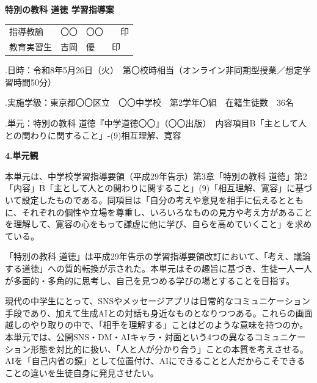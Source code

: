 \documentclass[uplatex,a4paper,11pt]{jsarticle}
\newcommand{\itemhead}[2]{\par\medskip\noindent\textbf{#1.\quad #2}\par\nopagebreak\smallskip}
\begin{document}
\begin{center}
  {\LARGE \textbf{特別の教科 道徳 学習指導案}}
\end{center}

\begin{flushright}
  \begin{tabular}{ll}
    指導教諭   & 〇〇　〇〇　　印 \\
    教育実習生 & 吉岡　優　　印 \\
  \end{tabular}
\end{flushright}

\bigskip

.\quad 日\hspace{1zw}時：令和8年5月26日（火）　第〇校時相当（オンライン非同期型授業／想定学習時間50分） \par
{}.\quad 実施学級：東京都〇〇区立　〇〇中学校　第2学年〇組　在籍生徒数　36名 \par
{}.\quad 単\hspace{1zw}元：特別の教科 道徳『中学道徳〇〇』（〇〇出版）　内容項目B「主として人との関わりに関すること」-(9)相互理解、寛容 \par


\itemhead{4}{単元観}
\hspace{1zw}本単元は、中学校学習指導要領（平成29年告示）第3章「特別の教科 道徳」第2「内容」B「主として人との関わりに関すること」(9)「相互理解、寛容」に基づいて設定したものである。同項目は「自分の考えや意見を相手に伝えるとともに、それぞれの個性や立場を尊重し、いろいろなものの見方や考え方があることを理解して、寛容の心をもって謙虚に他に学び、自らを高めていくこと」を求めている。\par
\hspace{1zw}「特別の教科 道徳」は平成29年告示の学習指導要領改訂において、「考え、議論する道徳」への質的転換が示された。本単元はその趣旨に基づき、生徒一人一人が多面的・多角的に思考し、自己を見つめる学びの場とすることを目指す。\par
\hspace{1zw}現代の中学生にとって、SNSやメッセージアプリは日常的なコミュニケーション手段であり、加えて生成AIとの対話も身近なものとなりつつある。これらの画面越しのやり取りの中で、「相手を理解する」ことはどのような意味を持つのか。本単元では、公開SNS・DM・AIキャラ・対面という4つの異なるコミュニケーション形態を対比的に扱い、「人と人が分かり合う」ことの本質を考えさせる。AIを「自己内省の鏡」として位置付け、AIにできることと人だからこそできることの違いを生徒自身に発見させたい。\par
\end{document}
